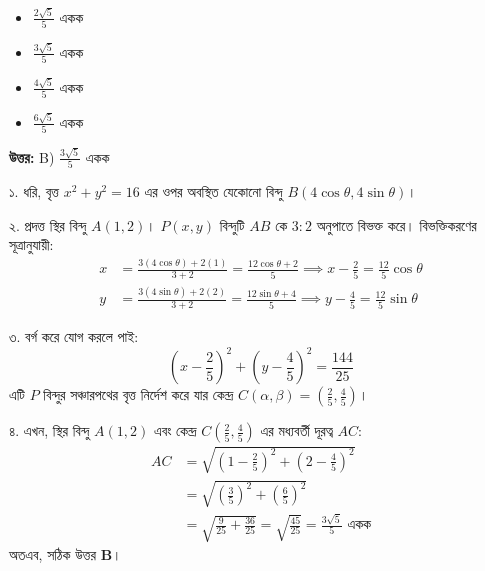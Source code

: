 \documentclass[12pt, a4paper]{article}
\begin{document}
\vspace{1em}
\begin{itemize}[label={}, leftmargin=1cm, itemsep=0.5em]
    \item[\textbf{A)}] $\frac{2\sqrt{5}}{5}$ একক
    \item[\textbf{B)}] $\frac{3\sqrt{5}}{5}$ একক
    \item[\textbf{C)}] $\frac{4\sqrt{5}}{5}$ একক
    \item[\textbf{D)}] $\frac{6\sqrt{5}}{5}$ একক
\end{itemize}

\vspace{0.5em}
\begin{tcolorbox}[answerbox]
    \textbf{\color{success} উত্তর:} B) $\frac{3\sqrt{5}}{5}$ একক
\end{tcolorbox}
\vspace{1em}

\begin{tcolorbox}[solutionbox={সমাধান (Solution)}]
    \noindent
    ১. ধরি, বৃত্ত $x^2 + y^2 = 16$ এর ওপর অবস্থিত যেকোনো বিন্দু $B(4\cos\theta, 4\sin\theta)$। 
    
    ২. প্রদত্ত স্থির বিন্দু $A(1, 2)$। $P(x, y)$ বিন্দুটি $AB$ কে $3:2$ অনুপাতে বিভক্ত করে। বিভক্তিকরণের সূত্রানুযায়ী:
    \begin{align*}
        x &= \frac{3(4\cos\theta) + 2(1)}{3+2} = \frac{12\cos\theta + 2}{5} \implies x - \frac{2}{5} = \frac{12}{5}\cos\theta \\
        y &= \frac{3(4\sin\theta) + 2(2)}{3+2} = \frac{12\sin\theta + 4}{5} \implies y - \frac{4}{5} = \frac{12}{5}\sin\theta
    \end{align*}
    
    ৩. বর্গ করে যোগ করলে পাই:
    \[ \left(x - \frac{2}{5}\right)^2 + \left(y - \frac{4}{5}\right)^2 = \frac{144}{25} \]
    এটি $P$ বিন্দুর সঞ্চারপথের বৃত্ত নির্দেশ করে যার কেন্দ্র $C(\alpha, \beta) = \left(\frac{2}{5}, \frac{4}{5}\right)$। 
    
    ৪. এখন, স্থির বিন্দু $A(1, 2)$ এবং কেন্দ্র $C\left(\frac{2}{5}, \frac{4}{5}\right)$ এর মধ্যবর্তী দূরত্ব $AC$:
    \begin{align*}
        AC &= \sqrt{\left(1 - \frac{2}{5}\right)^2 + \left(2 - \frac{4}{5}\right)^2} \\
           &= \sqrt{\left(\frac{3}{5}\right)^2 + \left(\frac{6}{5}\right)^2} \\
           &= \sqrt{\frac{9}{25} + \frac{36}{25}} = \sqrt{\frac{45}{25}} = \frac{3\sqrt{5}}{5} \text{ একক}
    \end{align*}
    অতএব, সঠিক উত্তর \textbf{B}।
\end{tcolorbox}
\end{document}
